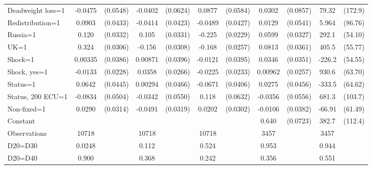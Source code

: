 \begin{tabular}{l|cccccc|cc|cc}
Deadweight loss=1&  -0.0475         & (0.0548)&  -0.0402         & (0.0624)&   0.0877         & (0.0584)&   0.0302         & (0.0857)&    79.32         &  (172.9)\\
Redistribution=1&   0.0903\sym{**} & (0.0433)&  -0.0414         & (0.0423)&  -0.0489         & (0.0427)&   0.0129         & (0.0541)&    5.964         &  (86.76)\\
Russia=1        &    0.120\sym{***}& (0.0332)&    0.105\sym{***}& (0.0331)&   -0.225\sym{***}& (0.0229)&   0.0599\sym{*}  & (0.0327)&    292.1\sym{***}&  (54.10)\\
UK=1            &    0.324\sym{***}& (0.0306)&   -0.156\sym{***}& (0.0308)&   -0.168\sym{***}& (0.0257)&   0.0813\sym{**} & (0.0361)&    405.5\sym{***}&  (55.77)\\
Shock=1         &  0.00335         & (0.0386)&  0.00871         & (0.0396)&  -0.0121         & (0.0395)&   0.0346         & (0.0351)&   -226.2\sym{***}&  (54.55)\\
Shock, yes=1    &  -0.0133         & (0.0228)&   0.0358         & (0.0266)&  -0.0225         & (0.0233)&  0.00962         & (0.0257)&    930.6\sym{***}&  (63.70)\\
Status=1        &   0.0642         & (0.0445)&  0.00294         & (0.0466)&  -0.0671\sym{*}  & (0.0406)&   0.0275         & (0.0456)&   -333.5\sym{***}&  (64.62)\\
Status, 200 ECU=1&  -0.0834\sym{*}  & (0.0504)&  -0.0342         & (0.0550)&    0.118\sym{*}  & (0.0632)&  -0.0356         & (0.0556)&    681.3\sym{***}&  (103.7)\\
Non-fixed=1     &   0.0290         & (0.0314)&  -0.0491         & (0.0319)&   0.0202         & (0.0302)&  -0.0106         & (0.0382)&   -66.91         &  (61.49)\\
Constant        &                  &         &                  &         &                  &         &    0.640\sym{***}& (0.0723)&    382.7\sym{***}&  (112.4)\\
\hline
Observations    &    10718         &         &    10718         &         &    10718         &         &     3457         &         &     3457         &         \\
D20=D30         &   0.0248         &         &    0.112         &         &    0.524         &         &    0.953         &         &    0.944         &         \\
D20=D40         &    0.900         &         &    0.368         &         &    0.242         &         &    0.356         &         &    0.551         &         \\

\end{tabular}
